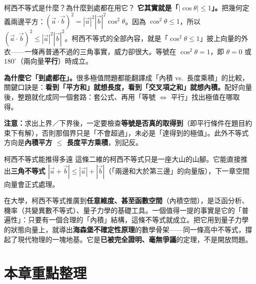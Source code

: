 \documentclass[11pt]{article}
\begin{document}
\begin{補充框}{柯西不等式是什麼？為什麼到處都在用它？}
\textbf{它其實就是「$|\cos\theta|\le1$」。}把幾何定義兩邊平方：$(\vec a\cdot\vec b)^2=|\vec a|^2|\vec b|^2\cos^2\theta$。因為 $\cos^2\theta\le1$，所以 $(\vec a\cdot\vec b)^2\le|\vec a|^2|\vec b|^2$。柯西不等式的全部內容，就是「$\cos^2\theta\le1$」披上向量的外衣——一條再普通不過的三角事實，威力卻很大。等號在 $\cos^2\theta=1$，即 $\theta=0$ 或 $180^\circ$（兩向量\textbf{平行}）時成立。

\textbf{為什麼它「到處都在」。}很多極值問題都能翻譯成「內積 vs.\ 長度乘積」的比較，關鍵口訣是：\textbf{看到「平方和」就想長度，看到「交叉項之和」就想內積。}配好向量後，整題就化成同一個套路：套公式、再用「等號 $\iff$ 平行」找出極值在哪取得。

\textbf{注意：}求出上界／下界後，一定要檢查\textbf{等號是否真的取得到}（即平行條件在題目約束下有解），否則那個界只是「不會超過」，未必是「達得到的極值」。此外不等式方向是\textbf{內積平方 $\le$ 長度平方乘積}，別記反。
\end{補充框}

\begin{延伸框}{柯西不等式能推得多遠}
這條二維的柯西不等式只是一座大山的山腳。它能直接推出\textbf{三角不等式 $|\vec a+\vec b|\le|\vec a|+|\vec b|$}（「兩邊和大於第三邊」的向量版），下一章空間向量會正式處理。

在大學，柯西不等式推廣到\textbf{任意維度、甚至函數空間}（內積空間），是泛函分析、機率（共變異數不等式）、量子力學的基礎工具。一個值得一提的事實是它的「普遍性」：只要有一個合理的「內積」結構，這條不等式就成立。把它用到量子力學的狀態向量上，就導出\textbf{海森堡不確定性原理}的數學骨架——同一條高中不等式，撐起了現代物理的一塊地基。它是\textbf{已被完全證明、毫無爭議}的定理，不是開放問題。
\end{延伸框}

\section*{\sffamily 本章重點整理}
\end{document}

